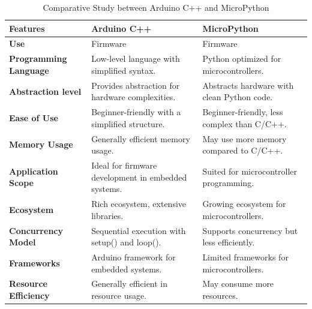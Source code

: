 \begin{table}[h]
    \centering
    \begin{tabularx}{\textwidth}{|X|X|X|}
        \hline

        \textbf{Features}
         & \textbf{Arduino C++}
         & \textbf{MicroPython} \\ \hline

        \textbf{Use} 
        & Firmware
        & Firmware \\ \hline

        \textbf{Programming Language}
        & Low-level language with simplified syntax.
        & Python optimized for microcontrollers. \\ \hline

        \textbf{Abstraction level}
        & Provides abstraction for hardware complexities.
        & Abstracts hardware with clean Python code. \\ \hline

        \textbf{Ease of Use}
        & Beginner-friendly with a simplified structure.
        & Beginner-friendly, less complex than C/C++. \\ \hline

        \textbf{Memory Usage}
        & Generally efficient memory usage. 
        & May use more memory compared to C/C++. \\ \hline

        \textbf{Application Scope}
        & Ideal for firmware development in embedded systems.
        & Suited for microcontroller programming. \\ \hline

        \textbf{Ecosystem}
        & Rich ecosystem, extensive libraries.
        & Growing ecosystem for microcontrollers. \\ \hline

        \textbf{Concurrency Model}
        & Sequential execution with setup() and loop().
        & Supports concurrency but less efficiently. \\ \hline

        \textbf{Frameworks}
        & Arduino framework for embedded systems.
        & Limited frameworks for microcontrollers. \\ \hline

        \textbf{Resource Efficiency}
        & Generally efficient in resource usage.
        & May consume more resources. \\ \hline
         
    \end{tabularx}
    \caption{Comparative Study between Arduino C++ and MicroPython}
    \label{table:programming-language}
\end{table}

